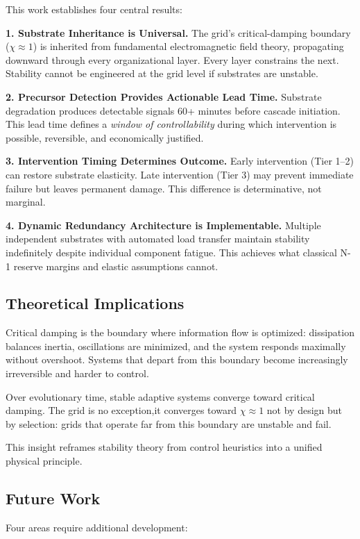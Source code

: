 \documentclass[11pt,letterpaper]{article}
\begin{document}
This work establishes four central results:

\textbf{1. Substrate Inheritance is Universal.}
The grid's critical-damping boundary ($\chi \approx 1$) is inherited from fundamental electromagnetic field theory, propagating downward through every organizational layer. Every layer constrains the next. Stability cannot be engineered at the grid level if substrates are unstable.

\textbf{2. Precursor Detection Provides Actionable Lead Time.}
Substrate degradation produces detectable signals 60+ minutes before cascade initiation. This lead time defines a \textit{window of controllability} during which intervention is possible, reversible, and economically justified.

\textbf{3. Intervention Timing Determines Outcome.}
Early intervention (Tier 1--2) can restore substrate elasticity. Late intervention (Tier 3) may prevent immediate failure but leaves permanent damage. This difference is determinative, not marginal.

\textbf{4. Dynamic Redundancy Architecture is Implementable.}
Multiple independent substrates with automated load transfer maintain stability indefinitely despite individual component fatigue. This achieves what classical N-1 reserve margins and elastic assumptions cannot.

\subsection{Theoretical Implications}

Critical damping is the boundary where information flow is optimized: dissipation balances inertia, oscillations are minimized, and the system responds maximally without overshoot. Systems that depart from this boundary become increasingly irreversible and harder to control.

Over evolutionary time, stable adaptive systems converge toward critical damping. The grid is no exception,it converges toward $\chi \approx 1$ not by design but by selection: grids that operate far from this boundary are unstable and fail.

This insight reframes stability theory from control heuristics into a unified physical principle.

\subsection{Future Work}

Four areas require additional development:
\end{document}
